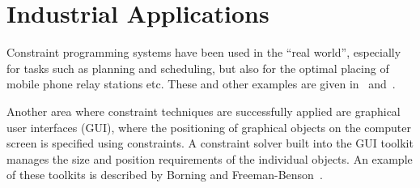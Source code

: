 \section{Industrial Applications}

Constraint programming systems have been used in the ``real world'',
especially for tasks such as planning and scheduling, but also for the
optimal placing of mobile phone relay stations etc.  These and other
examples are given in~\cite{fruehwirthAnwendungen}
and~\cite{marriot98programmingwithconstraints}.

Another area where constraint techniques are successfully applied are
graphical user interfaces (GUI), where the positioning of graphical
objects on the computer screen is specified using constraints.  A
constraint solver built into the GUI toolkit manages the size and
position requirements of the individual objects.  An example of these
toolkits is described by Borning and
Freeman-Benson~\cite{borning95oti}.




